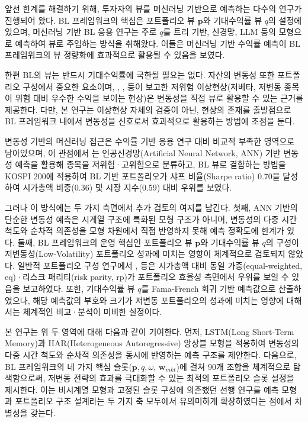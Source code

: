 \documentclass{article}
\begin{document}
앞선 한계를 해결하기 위해, 투자자의 뷰를 머신러닝 기반으로 예측하는 다수의 연구가 진행되어 왔다. BL 프레임워크의 핵심은 포트폴리오 뷰 $\mathbf{p}$와 기대수익률 뷰 $q$의 설정에 있으며, 머신러닝 기반 BL 응용 연구는 주로 $q$를 트리 기반, 신경망, LLM 등의 모형으로 예측하여 뷰로 주입하는 방식을 취해왔다\citep{barua2023using, su2026objective, lee2025llm}. 이들은 머신러닝 기반 수익률 예측이 BL 프레임워크의 뷰 정량화에 효과적으로 활용될 수 있음을 보였다.

한편 BL의 뷰는 반드시 기대수익률에 국한될 필요는 없다. 자산의 변동성 또한 포트폴리오 구성에서 중요한 요소이며, \citet{baker2011}, \citet{frazzini2014}, \citet{blitz2007} 등이 보고한 저위험 이상현상(저베타, 저변동 종목이 위험 대비 우수한 수익을 보이는 현상)은 변동성을 직접 뷰로 활용할 수 있는 근거를 제공한다. 다만, 본 연구는 이상현상 자체의 검증이 아닌, 현상의 존재를 출발점으로 BL 프레임워크 내에서 변동성을 신호로서 효과적으로 활용하는 방법에 초점을 둔다.

변동성 기반의 머신러닝 접근은 수익률 기반 응용 연구 대비 비교적 부족한 영역으로 남아있으며, 이 관점에서 \citet{pyo2018}는 인공신경망(Artificial Neural Network, ANN) 기반 변동성 예측을 활용해 종목을 저위험·고위험으로 분류하고, BL 뷰로 결합하는 방법을 KOSPI 200에 적용하여 BL 기반 포트폴리오가 샤프 비율(Sharpe ratio) 0.70을 달성하여 시가총액 비중(0.36) 및 시장 지수(0.59) 대비 우위를 보였다.

그러나 이 방식에는 두 가지 측면에서 추가 검토의 여지를 남긴다. 첫째, ANN 기반의 단순한 변동성 예측은 시계열 구조에 특화된 모형 구조가 아니며, 변동성의 다중 시간 척도\citep{corsi2009}와 순차적 의존성을 모형 차원에서 직접 반영하지 못해 예측 정확도에 한계가 있다. 둘째, BL 프레임워크의 운영 핵심인 포트폴리오 뷰 $\mathbf{p}$와 기대수익률 뷰 $q$의 구성이 저변동성(Low-Volatility) 포트폴리오 성과에 미치는 영향이 체계적으로 검토되지 않았다. 일반적 포트폴리오 구성 연구에서 \citet{demiguel2009optimal}, \citet{maillard2010} 등은 시가총액 대비 동일 가중(equal-weighted, eq)·리스크 패리티(risk parity, rp)가 포트폴리오 효율성 측면에서 우위를 보일 수 있음을 보고하였다. 또한, 기대수익률 뷰 $q$를 Fama-French 회귀 기반 예측값으로 산출하였으나, 해당 예측값의 부호와 크기가 저변동 포트폴리오의 성과에 미치는 영향에 대해서는 체계적인 비교·분석이 미비한 실정이다. 

본 연구는 위 두 영역에 대해 다음과 같이 기여한다. 먼저, LSTM(Long Short-Term Memory)과 HAR(Heterogeneous Autoregressive) 앙상블 모형을 적용하여 변동성의 다중 시간 척도와 순차적 의존성을 동시에 반영하는 예측 구조를 제안한다. 다음으로, BL 프레임워크의 네 가지 핵심 슬롯($\mathbf{p}, q, \omega$, $\mathbf{w}_{mkt}$)에 걸쳐 90개 조합을 체계적으로 탐색함으로써, 저변동 전략의 효과를 극대화할 수 있는 최적의 포트폴리오 슬롯 설정을 제시한다. 이는 비시계열 모형과 고정된 슬롯 구성에 의존했던 선행 연구\citep{pyo2018}를 예측 모형과 포트폴리오 구조 설계라는 두 가지 축 모두에서 유의미하게 확장하였다는 점에서 차별성을 갖는다.
\end{document}
